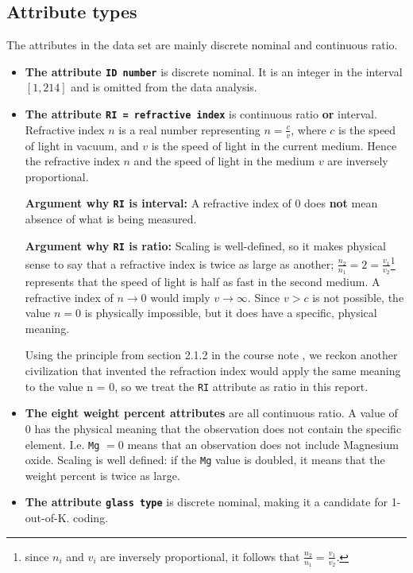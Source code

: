 \subsection{Attribute types}
The attributes in the data set are mainly discrete nominal  and continuous ratio.

\begin{itemize}
    \item \textbf{The attribute \texttt{ID number}} is discrete nominal. It is an integer in the interval $[1, 214]$ and is omitted from the data analysis.
    
    \item \textbf{The attribute \texttt{RI = refractive index}} is continuous ratio \textbf{or} interval. Refractive index $n$ is a real number representing $n = \frac{c}{v}$, where $c$ is the speed of light in vacuum, and $v$ is the speed of light in the current medium. Hence the refractive index $n$ and the speed of light in the medium $v$ are inversely proportional.
    
    \textbf{Argument why \texttt{RI} is interval:} A refractive index of 0 does \textbf{not} mean absence of what is being measured.
    
    \textbf{Argument why \texttt{RI} is ratio:}
    Scaling is well-defined, so it makes physical sense to say that a refractive index is twice as large as another; $\frac{n_2}{n_1} = 2 = \frac{v_1}{v_2}$\footnote{since $n_i$ and $v_i$ are inversely proportional, it follows that $\frac{n_2}{n_1} = \frac{v_1}{v_2}$.} represents that the speed of light is half as fast in the second medium. A refractive index of $n \rightarrow 0$ would imply $v \rightarrow \infty$. Since $v>c$ is not possible, the value $n=0$ is physically impossible, but it does have a specific, physical meaning. 
    
    
    
    Using the principle from section 2.1.2 in the course note \cite{coursenotes}, we reckon another civilization that invented the refraction index would apply the same meaning to the value n = 0, so we treat the \texttt{RI} attribute as ratio in this report.
    
    \item \textbf{The eight weight percent attributes} are all continuous ratio. A value of 0 has the physical meaning that the observation does not contain the specific element. I.e. \texttt{Mg} $ = 0$ means that an observation does not include Magnesium oxide. Scaling is well defined: if the \texttt{Mg} value is doubled, it means that the weight percent is twice as large.
    
    \item \textbf{The attribute \texttt{glass type}} is discrete nominal, making it a candidate for 1-out-of-K. coding.
\end{itemize}

